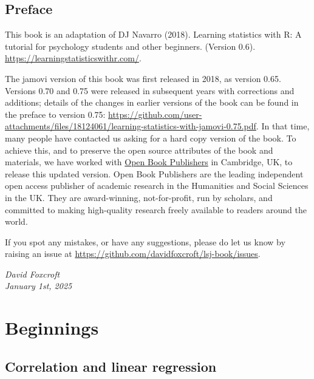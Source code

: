 \documentclass[
  a4paper,
]{book}
\renewcommand*\contentsname{Table of contents}
\newcommand\contentsname{Table of contents}
\begin{document}
\renewcommand*\contentsname{Table of contents}
{
\hypersetup{linkcolor=}
\setcounter{tocdepth}{2}
\tableofcontents
}
\mainmatter
{}

\hypertarget{preface}{%
\chapter*{Preface}\label{preface}}


This book is an adaptation of DJ Navarro (2018). Learning statistics
with R: A tutorial for psychology students and other beginners. (Version
0.6). \url{https://learningstatisticswithr.com/}.

The jamovi version of this book was first released in 2018, as version
0.65. Versions 0.70 and 0.75 were released in subsequent years with
corrections and additions; details of the changes in earlier versions of
the book can be found in the preface to version 0.75:
\url{https://github.com/user-attachments/files/18124061/learning-statistics-with-jamovi-0.75.pdf}.
In that time, many people have contacted us asking for a hard copy
version of the book. To achieve this, and to preserve the open source
attributes of the book and materials, we have worked with
\href{https://www.openbookpublishers.com/books/10.11647/obp.0333}{Open
Book Publishers} in Cambridge, UK, to release this updated version. Open
Book Publishers are the leading independent open access publisher of
academic research in the Humanities and Social Sciences in the UK. They
are award-winning, not-for-profit, run by scholars, and committed to
making high-quality research freely available to readers around the
world.

If you spot any mistakes, or have any suggestions, please do let us know
by raising an issue at
\url{https://github.com/davidfoxcroft/lsj-book/issues}.

\emph{David Foxcroft\\
January 1st, 2025}

\part{Beginnings}

\hypertarget{sec-Correlation-and-linear-regression}{%
\chapter{Correlation and linear
regression}\label{sec-Correlation-and-linear-regression}}
\end{document}
